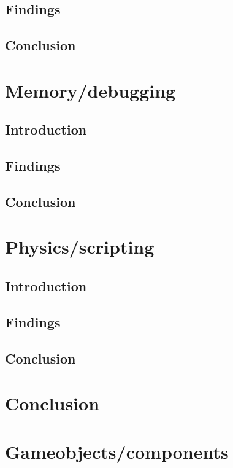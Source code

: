 \documentclass{projdoc}
\begin{document}
\subsection{Findings}

\subsection{Conclusion}

\section{Memory/debugging}

\subsection{Introduction}

\subsection{Findings}

\subsection{Conclusion}

\section{Physics/scripting}

\subsection{Introduction}

\subsection{Findings}

\subsection{Conclusion}

\section{Conclusion}

\section{Gameobjects/components}
\end{document}

